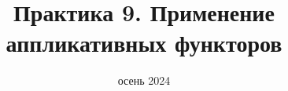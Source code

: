 
\newif\ifhandout




\title[9. Применение аппликативов]{Практика 9. Применение аппликативных функторов}
\date{осень 2024}



    \setcounter{framenumber}{-1}
    \maketitle


